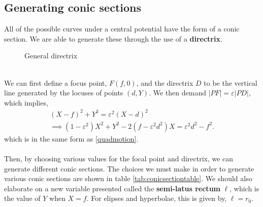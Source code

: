 \documentclass{book}
\begin{document}
\subsection{Generating conic sections}
All of the possible curves under a central potential have the form of a conic section. We are able to generate these through the use of a \textbf{directrix}.
\begin{figure}[h]
    \centering
    \caption{General directrix}
    \label{fig:directrix}
\end{figure}\\
We can first define a focus point, $F(f,0)$, and the directrix $D$ to be the vertical line generated by the locuses of points $(d,Y)$. We then demand $|PF| = \varepsilon|PD|$, which implies,
\begin{equation}
    \begin{split}
        (X-f)^2 + Y^2 = \varepsilon^2(X-d)^2 \\
        \implies (1-\varepsilon^2)X^2 + Y^2 - 2(f-\varepsilon^2d^2)X = \varepsilon^2d^2 - f^2.
    \end{split}
\end{equation}
which is in the same form as \eqref{quadmotion}. \\\\
Then, by choosing various values for the focal point and directrix, we can generate different conic sections. The choices we must make in order to generate various conic sections are shown in table \ref{tab:conicsectiontable}. We should also elaborate on a new variable presented called the \textbf{semi-latus rectum} $\ell$, which is the value of $Y$ when $X = f$. For elipses and hyperbolae, this is given by, $\ell = r_0$.
\end{document}
